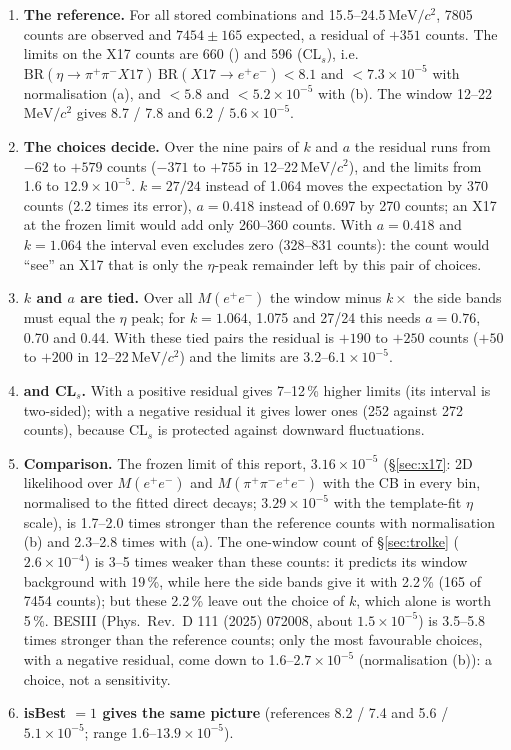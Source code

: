 \documentclass[11pt,a4paper]{article}
\newcommand{\ee}{\ensuremath{e^{+}e^{-}}\xspace}
\newcommand{\pipi}{\ensuremath{\pi^{+}\pi^{-}}\xspace}
\newcommand{\Mfour}{\ensuremath{M(\pi^{+}\pi^{-}e^{+}e^{-})}\xspace}
\newcommand{\Mee}{\ensuremath{M(e^{+}e^{-})}\xspace}
\newcommand{\MeVcc}{\ensuremath{\mathrm{MeV}/c^{2}}\xspace}
\newcommand{\code}[1]{\texttt{\detokenize{#1}}}
\newcommand{\BRX}{\ensuremath{\mathrm{BR}(\eta\to\pipi X17)\,\mathrm{BR}(X17\to\ee)}\xspace}
\begin{document}
\begin{enumerate}\setlength{\itemsep}{1pt}
\item \textbf{The reference.} For all stored combinations and 15.5--24.5\,\MeVcc, 7805 counts are observed and $7454\pm165$ expected, a
      residual of $+351$ counts. The limits on the X17 counts are 660 (\code{TRolke}) and 596 (CL$_s$), i.e.\ $\BRX<8.1$ and
      $<7.3\times10^{-5}$ with normalisation (a), and $<5.8$ and $<5.2\times10^{-5}$ with (b). The window 12--22\,\MeVcc gives 8.7 / 7.8
      and 6.2 / $5.6\times10^{-5}$.
\item \textbf{The choices decide.} Over the nine pairs of $k$ and $a$ the residual runs from $-62$ to $+579$ counts ($-371$ to $+755$ in
      12--22\,\MeVcc), and the limits from 1.6 to $12.9\times10^{-5}$. $k=27/24$ instead of 1.064 moves the expectation by 370 counts (2.2
      times its error), $a=0.418$ instead of 0.697 by 270 counts; an X17 at the frozen limit would add only 260--360 counts. With $a=0.418$ and
      $k=1.064$ the \code{TRolke} interval even excludes zero (328--831 counts): the count would ``see'' an X17 that is only the $\eta$-peak
      remainder left by this pair of choices.
\item \textbf{$k$ and $a$ are tied.} Over all \Mee the window minus $k\times$ the side bands must equal the $\eta$ peak; for $k=1.064$,
      1.075 and 27/24 this needs $a=0.76$, 0.70 and 0.44. With these tied pairs the residual is $+190$ to $+250$ counts ($+50$ to $+200$ in
      12--22\,\MeVcc) and the limits are 3.2--$6.1\times10^{-5}$.
\item \textbf{\code{TRolke} and CL$_s$.} With a positive residual \code{TRolke} gives 7--12\,\% higher limits (its interval is two-sided);
      with a negative residual it gives lower ones (252 against 272 counts), because CL$_s$ is protected against downward fluctuations.
\item \textbf{Comparison.} The frozen limit of this report, $3.16\times10^{-5}$ (\S\ref{sec:x17}: 2D likelihood over \Mee and \Mfour with
      the CB in every bin, normalised to the fitted direct decays; $3.29\times10^{-5}$ with the template-fit $\eta$ scale), is 1.7--2.0 times
      stronger than the reference counts with normalisation (b) and 2.3--2.8 times with (a). The one-window \code{TRolke} count of
      \S\ref{sec:trolke} ($2.6\times10^{-4}$) is 3--5 times weaker than these counts: it predicts its window background with 19\,\%, while
      here the side bands give it with 2.2\,\% (165 of 7454 counts); but these 2.2\,\% leave out the choice of $k$, which alone is worth
      5\,\%. BESIII (Phys.\ Rev.\ D 111 (2025) 072008, about $1.5\times10^{-5}$) is 3.5--5.8 times stronger than the reference counts; only
      the most favourable choices, with a negative residual, come down to 1.6--$2.7\times10^{-5}$ (normalisation (b)): a choice, not a
      sensitivity.
\item \textbf{isBest $=1$ gives the same picture} (references 8.2 / 7.4 and 5.6 / $5.1\times10^{-5}$; range 1.6--$13.9\times10^{-5}$).
\end{enumerate}
\end{document}
